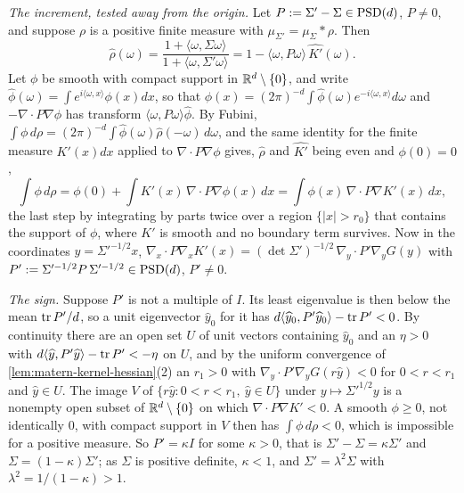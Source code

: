 \emph{The increment, tested away from the origin.} Let $P := \Sigma' - \Sigma \in \mathrm{PSD}(d)$,
$P \ne 0$, and suppose $\rho$ is a positive finite measure with $\mu_{\Sigma'} = \mu_\Sigma * \rho$.
Then
\[
  \widehat\rho(\omega) = \frac{1 + \langle\omega,\Sigma\omega\rangle}{1 + \langle\omega,\Sigma'\omega\rangle}
   = 1 - \langle\omega,P\omega\rangle\,\widehat{K'}(\omega) .
\]
Let $\phi$ be smooth with compact support in $\mathbb{R}^d \setminus \{0\}$, and write
$\widehat\phi(\omega) = \int e^{i\langle\omega,x\rangle}\phi(x)dx$, so that
$\phi(x) = (2\pi)^{-d}\int\widehat\phi(\omega)e^{-i\langle\omega,x\rangle}d\omega$ and
$-\nabla\cdot P\nabla\phi$ has transform $\langle\omega,P\omega\rangle\widehat\phi$. By Fubini,
$\int\phi\,d\rho = (2\pi)^{-d}\int\widehat\phi(\omega)\widehat\rho(-\omega)\,d\omega$, and the same
identity for the finite measure $K'(x)dx$ applied to $\nabla\cdot P\nabla\phi$ gives, $\widehat\rho$
and $\widehat{K'}$ being even and $\phi(0) = 0$,
\[
  \int\phi\,d\rho = \phi(0) + \int K'(x)\,\nabla\cdot P\nabla\phi(x)\,dx
   = \int\phi(x)\,\nabla\cdot P\nabla K'(x)\,dx ,
\]
the last step by integrating by parts twice over a region $\{|x| > r_0\}$ that contains the support
of $\phi$, where $K'$ is smooth and no boundary term survives. Now in the coordinates
$y = \Sigma'^{-1/2}x$, $\nabla_x\cdot P\nabla_xK'(x) = (\det\Sigma')^{-1/2}\,\nabla_y\cdot
P'\nabla_yG(y)$ with $P' := \Sigma'^{-1/2}P\,\Sigma'^{-1/2} \in \mathrm{PSD}(d)$, $P' \ne 0$.

\emph{The sign.} Suppose $P'$ is not a multiple of $I$. Its least eigenvalue is then below the
mean $\operatorname{tr} P'/d$, so a unit eigenvector $\widehat y_0$ for it has
$d\langle\widehat y_0,P'\widehat y_0\rangle - \operatorname{tr} P' < 0$. By continuity there are an open set
$U$ of unit vectors containing $\widehat y_0$ and an $\eta > 0$ with
$d\langle\widehat y,P'\widehat y\rangle - \operatorname{tr} P' < -\eta$ on $U$, and by the uniform convergence
of \ref{lem:matern-kernel-hessian}(2) an $r_1 > 0$ with $\nabla_y\cdot P'\nabla_yG(r\widehat y) < 0$ for $0 < r < r_1$ and
$\widehat y \in U$. The image $V$ of $\{r\widehat y : 0 < r < r_1,\ \widehat y \in U\}$ under
$y \mapsto \Sigma'^{1/2}y$ is a nonempty open subset of $\mathbb{R}^d \setminus \{0\}$ on which
$\nabla\cdot P\nabla K' < 0$. A smooth $\phi \ge 0$, not identically $0$, with compact support in
$V$ then has $\int\phi\,d\rho < 0$, which is impossible for a positive measure. So
$P' = \kappa I$ for some $\kappa > 0$, that is $\Sigma' - \Sigma = \kappa\Sigma'$ and
$\Sigma = (1-\kappa)\Sigma'$; as $\Sigma$ is positive definite, $\kappa < 1$, and
$\Sigma' = \lambda^2\Sigma$ with $\lambda^2 = 1/(1-\kappa) > 1$.

